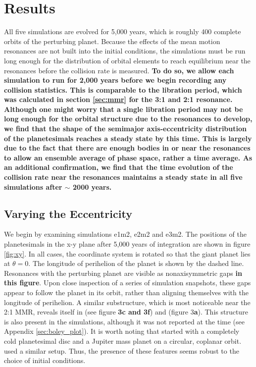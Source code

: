 \documentclass[fleqn,usenatbib]{mnras}
\begin{document}
\section{Results} \label{sec:results}

All five simulations are evolved for 5,000 years, which is roughly 400 complete orbits of the perturbing planet. Because the effects of the mean 
motion resonances are not built into the initial conditions, the simulations must be run long enough for the distribution of orbital elements to reach 
equilibrium near the resonances before the collision rate is measured. \textbf{To do so, we allow each simulation to run for 2,000 years before we begin recording any collision statistics. This is comparable to the libration period, which was calculated in section \ref{sec:mmr} for the 3:1 and 2:1 resonance. Although one might worry that a single libration period may not be long enough for the orbital structure due to the resonances to develop, we find that the shape of the semimajor axis-eccentricity distribution of the planetesimals reaches a steady state by this time. This is largely due to the fact that there are enough bodies in or near the resonances to allow an ensemble average of phase space, rather a time average. As an additional confirmation, we find that the time evolution of the collision rate near the resonances maintains a steady state in all five simulations after $\sim$ 2000 years.}

\subsection{Varying the Eccentricity} \label{sec:vary_ecc}

We begin by examining simulations e1m2, e2m2 and e3m2. The positions of the planetesimals in the x-y plane after 5,000 years of integration are 
shown in figure \ref{fig:xy}. In all cases, the coordinate system is rotated so that the giant planet lies at $\theta = 0$. The longitude of perihelion of 
the planet is shown by the dashed line. Resonances with the perturbing planet are visible as nonaxisymmetric gaps \textbf{in this figure}. Upon close inspection of a 
series of simulation snapshots, these gaps appear to follow the planet in its orbit, rather than aligning themselves with the longitude of perihelion. A 
similar substructure, which is most noticeable near the 2:1 MMR, reveals itself in \citet{2000Icar..143...45R} (see figure \textbf{3c and 3f}) and 
\citet{2016ApJ...818..159T} (figure 3\textbf{a}). This structure is also present in the \citet{2017ApJ...850..103B} simulations, although it was not reported at the 
time (see Appendix \ref{sec:boley_plot}). It is worth noting that \citet{2000Icar..143...45R} started with a completely cold planetesimal disc and a 
Jupiter mass planet on a circular, coplanar
orbit. \citet{2017ApJ...850..103B} used a similar setup.
Thus, the presence of these features seems robust 
to the choice of initial conditions.
\end{document}
